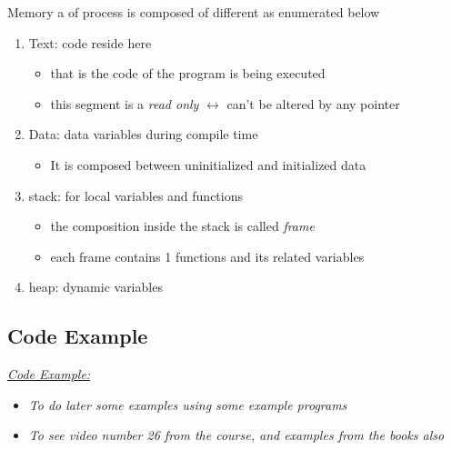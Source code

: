 \documentclass[12pt,a4paper]{book}
\begin{document}
Memory a of process is composed of different  as enumerated below

\begin{enumerate}

\item Text: code reside here

    \begin{itemize}
        \item that is the code of the program is being executed

        \item this segment is a \textit{read only} $\leftrightarrow$ can't be altered by any pointer
    \end{itemize}

\item Data: data variables during compile time

    \begin{itemize}
        \item It is composed between uninitialized and initialized data 
    \end{itemize}

\item  stack: for local variables and functions

    \begin{itemize}
        \item the composition inside the stack is called \textit{frame}

        \item each frame contains 1 functions and its related variables
    \end{itemize}

\item heap: dynamic variables

\end{enumerate}

\subsection{Code Example}

 \underline{\textit{Code Example:}}

\begin{itemize}

\item \textit{To do later some examples using some example programs}

\item \textit{To see video number 26 from the course, and examples from the books also}

\end{itemize}
\end{document}
